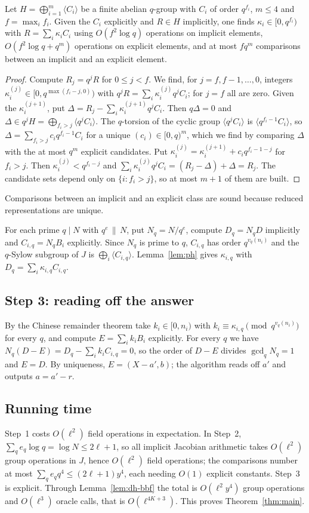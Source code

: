 \begin{lemma}\label{lem:ph}
Let $H=\bigoplus_{i=1}^m\langle C_i\rangle$ be a finite abelian $q$-group with $C_i$ of order $q^{f_i}$,
$m\le4$ and $f=\max_i f_i$. Given the $C_i$ explicitly and $R\in H$ implicitly, one finds
$\kappa_i\in[0,q^{f_i})$ with $R=\sum_i\kappa_iC_i$ using $O(f^2\log q)$ operations on implicit elements,
$O(f^2\log q+q^m)$ operations on explicit elements, and at most $fq^m$ comparisons between an implicit
and an explicit element.
\end{lemma}

\begin{proof}
Compute $R_j=q^jR$ for $0\le j<f$. We find, for $j=f,f-1,\dots,0$, integers
$\kappa_i^{(j)}\in[0,q^{\max(f_i-j,0)})$ with $q^jR=\sum_i\kappa_i^{(j)}q^jC_i$; for $j=f$ all are zero.
Given the $\kappa_i^{(j+1)}$, put $\Delta=R_j-\sum_i\kappa_i^{(j+1)}q^jC_i$. Then $q\Delta=0$ and
$\Delta\in q^jH=\bigoplus_{f_i>j}\langle q^jC_i\rangle$. The $q$-torsion of the cyclic group
$\langle q^jC_i\rangle$ is $\langle q^{f_i-1}C_i\rangle$, so $\Delta=\sum_{f_i>j}c_iq^{f_i-1}C_i$ for a unique
$(c_i)\in[0,q)^{m}$, which we find by comparing $\Delta$ with the at most $q^m$ explicit candidates. Put
$\kappa_i^{(j)}=\kappa_i^{(j+1)}+c_iq^{f_i-1-j}$ for $f_i>j$. Then $\kappa_i^{(j)}<q^{f_i-j}$ and
$\sum_i\kappa_i^{(j)}q^jC_i=(R_j-\Delta)+\Delta=R_j$. The candidate sets depend only on
$\{i:f_i>j\}$, so at most $m+1$ of them are built.
\end{proof}

Comparisons between an implicit and an explicit class are sound because reduced representations are unique.

For each prime $q\mid N$ with $q^e\,\|\,N$, put $N_q=N/q^e$, compute $D_q=N_qD$ implicitly and $C_{i,q}=N_qB_i$
explicitly. Since $N_q$ is prime to $q$, $C_{i,q}$ has order $q^{v_q(n_i)}$ and the $q$-Sylow subgroup of $J$
is $\bigoplus_i\langle C_{i,q}\rangle$. Lemma~\ref{lem:ph} gives $\kappa_{i,q}$ with
$D_q=\sum_i\kappa_{i,q}C_{i,q}$.

\subsection{Step 3: reading off the answer}
By the Chinese remainder theorem take $k_i\in[0,n_i)$ with $k_i\equiv\kappa_{i,q}\pmod{q^{v_q(n_i)}}$ for every
$q$, and compute $E=\sum_ik_iB_i$ explicitly. For every $q$ we have $N_q(D-E)=D_q-\sum_ik_iC_{i,q}=0$, so the order
of $D-E$ divides $\gcd_qN_q=1$ and $E=D$. By uniqueness, $E=(X-a',b)$; the algorithm reads off $a'$ and outputs
$a=a'-r$.

\subsection{Running time}
Step~1 costs $O(\ell^2)$ field operations in expectation. In Step~2, $\sum_q e_q\log q=\log N\le2\ell+1$, so all
implicit Jacobian arithmetic takes $O(\ell^2)$ group operations in $J$, hence $O(\ell^2)$ field operations; the
comparisons number at most $\sum_qe_qq^4\le(2\ell+1)y^4$, each needing $O(1)$ explicit constants. Step~3 is
explicit. Through Lemma~\ref{lem:dh-bbf} the total is $O(\ell^2y^4)$ group operations and $O(\ell^3)$ oracle
calls, that is $O(\ell^{4K+3})$. This proves Theorem~\ref{thm:main}.
